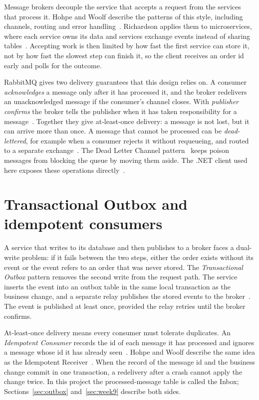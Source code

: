 \documentclass[a4paper]{report}
\begin{document}
Message brokers decouple the service that accepts a request from the services
that process it. Hohpe and Woolf describe the patterns of this style, including
channels, routing and error handling~\cite{hohpe-eip}. Richardson applies them
to microservices, where each service owns its data and services exchange events
instead of sharing tables~\cite{richardson-patterns}. Accepting work is then
limited by how fast the first service can store it, not by how fast the slowest
step can finish it, so the client receives an order id early and polls for the
outcome.

RabbitMQ gives two delivery guarantees that this design relies on. A consumer
\emph{acknowledges} a message only after it has processed it, and the broker
redelivers an unacknowledged message if the consumer's channel closes. With
\emph{publisher confirms} the broker tells the publisher when it has taken
responsibility for a message~\cite{rmq-confirms}. Together they give
at-least-once delivery: a message is not lost, but it can arrive more than
once. A message that cannot be processed can be \emph{dead-lettered}, for
example when a consumer rejects it without requeueing, and routed to a separate
exchange~\cite{rmq-dlx}. The Dead Letter Channel
pattern~\cite{eip-dead-letter} keeps poison messages from blocking the queue
by moving them aside. The .NET client used here exposes these operations
directly~\cite{rmq-dotnet}.

\section{Transactional Outbox and idempotent consumers}
\label{sec:bg-outbox}

A service that writes to its database and then publishes to a broker faces a
dual-write problem: if it fails between the two steps, either the order exists
without its event or the event refers to an order that was never stored. The
\emph{Transactional Outbox} pattern removes the second write from the request
path. The service inserts the event into an outbox table in the same local
transaction as the business change, and a separate relay publishes the stored
events to the broker~\cite{richardson-outbox,richardson-patterns}. The event is
published at least once, provided the relay retries until the broker confirms.

At-least-once delivery means every consumer must tolerate duplicates. An
\emph{Idempotent Consumer} records the id of each message it has processed and
ignores a message whose id it has already seen~\cite{richardson-idempotent}.
Hohpe and Woolf describe the same idea as the Idempotent
Receiver~\cite{eip-idempotent}. When the record of the message id and the
business change commit in one transaction, a redelivery after a crash cannot
apply the change twice. In this project the processed-message table is called
the Inbox; Sections~\ref{sec:outbox} and~\ref{sec:week9} describe both sides.
\end{document}
